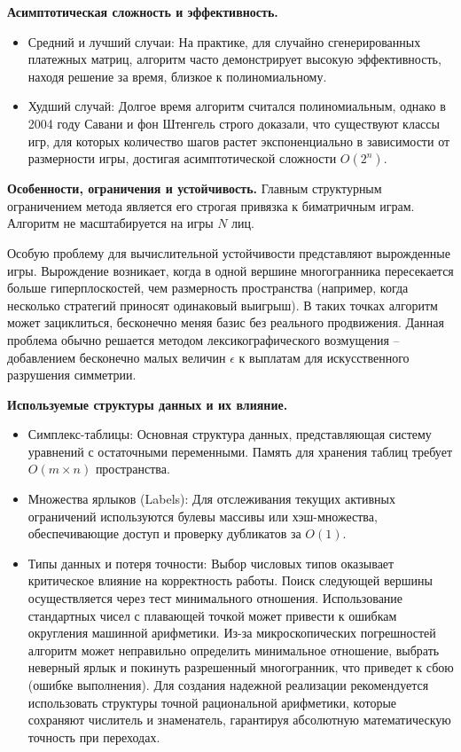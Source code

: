 \textbf{Асимптотическая сложность и эффективность.} 
\begin{itemize}
    \item Средний и лучший случаи: На практике, для случайно сгенерированных платежных матриц, алгоритм часто демонстрирует высокую эффективность, находя решение за время, близкое к полиномиальному.
    \item Худший случай: Долгое время алгоритм считался полиномиальным, однако в 2004 году Савани и фон Штенгель строго доказали, что существуют классы игр, для которых количество шагов растет экспоненциально в зависимости от размерности игры, достигая асимптотической сложности $O(2^n)$.
\end{itemize}

\textbf{Особенности, ограничения и устойчивость.}
Главным структурным ограничением метода является его строгая привязка к биматричным играм. Алгоритм не масштабируется на игры $N$ лиц. 

Особую проблему для вычислительной устойчивости представляют  вырожденные игры. Вырождение возникает, когда в одной вершине многогранника пересекается больше гиперплоскостей, чем размерность пространства (например, когда несколько стратегий приносят одинаковый выигрыш). В таких точках алгоритм может зациклиться, бесконечно меняя базис без реального продвижения. Данная проблема обычно решается методом лексикографического возмущения – добавлением бесконечно малых величин $\epsilon$ к выплатам для искусственного разрушения симметрии.

\textbf{Используемые структуры данных и их влияние.}
\begin{itemize}
    \item Симплекс-таблицы: Основная структура данных, представляющая систему уравнений с остаточными переменными. Память для хранения таблиц требует $O(m \times n)$ пространства.
    \item Множества ярлыков (Labels): Для отслеживания текущих активных ограничений используются булевы массивы или хэш-множества, обеспечивающие доступ и проверку дубликатов за $O(1)$.
    \item Типы данных и потеря точности: Выбор числовых типов оказывает критическое влияние на корректность работы. Поиск следующей вершины осуществляется через тест минимального отношения. Использование стандартных чисел с плавающей точкой может привести к ошибкам округления машинной арифметики. Из-за микроскопических погрешностей алгоритм может неправильно определить минимальное отношение, выбрать неверный ярлык и покинуть разрешенный многогранник, что приведет к сбою (ошибке выполнения). Для создания надежной реализации рекомендуется использовать структуры точной рациональной арифметики, которые сохраняют числитель и знаменатель, гарантируя абсолютную математическую точность при переходах.
\end{itemize}

